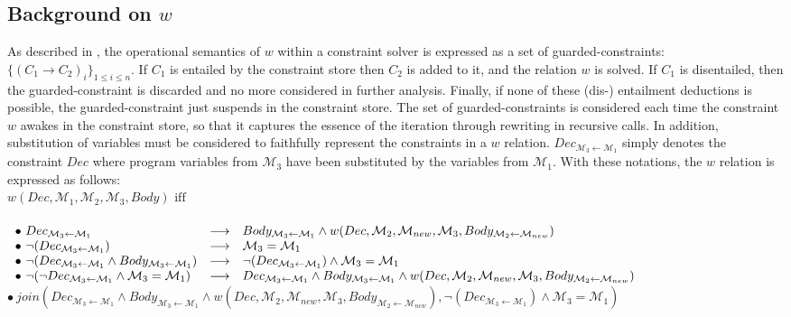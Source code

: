 \documentclass[submission,copyright,creativecommons]{eptcs}
\newcommand{\M}{\mathcal{M}}
\begin{document}
\subsection{Background on $w$}
As described in \cite{GBR00},
the operational semantics of $w$ within a constraint solver is expressed as a set of guarded-constraints: $\{(C_1 \longrightarrow C_2)_i\}_{1\leq i \leq n}$. If $C_1$ is entailed by the constraint store then $C_2$ is added to it, and the relation $w$ is solved. If $C_1$ is disentailed, then the guarded-constraint is discarded and no more considered in further analysis. Finally, if none of these (dis-) entailment deductions is possible, the guarded-constraint just suspends in the constraint store. The set of guarded-constraints is considered each time the constraint $w$ awakes in the constraint store, so that it captures the essence of the iteration through rewriting in recursive calls. In addition, substitution of variables must be considered to faithfully represent the constraints in a $w$ relation. $Dec_{\M_3 \leftarrow \M_1}$ simply denotes the constraint $Dec$ where program variables from $\M_3$ have been substituted by the variables from $\M_1$. With these notations, the $w$ relation is expressed as follows:\\
\( w(Dec, \M_1, \M_2, \M_3, Body)   \mbox{  iff  } \)\\ \\
\(\begin{array}{l l l}
    \bullet\ Dec_{\M_3 \leftarrow \M_1} & \longrightarrow   & Body_{\M_3 \leftarrow \M_1} \land w(Dec, \M_2,\M_{new},\M_3, Body_{\M_2 \leftarrow \M_{new}}) \\  
    \bullet\ \neg( Dec_{\M_3 \leftarrow \M_1}) &    \longrightarrow       & \M_3 = \M_1    \\
    \bullet\ \neg(Dec_{\M_3 \leftarrow \M_1} \land Body_{\M_3 \leftarrow \M_1} ) & \longrightarrow &  \neg( Dec_{\M_3 \leftarrow \M_1} ) \land \M_3 = \M_1 \\
    \bullet\ \neg(\neg Dec_{\M_3 \leftarrow \M_1} \land \M_3 = \M_1) &  \longrightarrow     &  Dec_{\M_3 \leftarrow \M_1} \land Body_{\M_3 \leftarrow \M_1} \land w(Dec,\M_2,\M_{new},\M_3, Body_{\M_2 \leftarrow \M_{new}}) \\
  \end{array}
\)\\
\(    \bullet\ join( Dec_{\M_3 \leftarrow \M_1} \land Body_{\M_3 \leftarrow \M_1} \land w(Dec,\M_2,\M_{new},\M_3, Body_{\M_2 \leftarrow \M_{new}}) ,  \neg(Dec_{\M_3 \leftarrow \M_1}) \land \M_3 = \M_1)
\)\\
\end{document}

